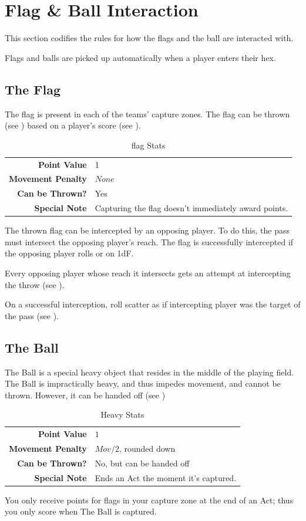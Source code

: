 \section{Flag \& Ball Interaction} \label{flag-interaction}
This section codifies the rules for how the flags and the ball are interacted with.

Flags and balls are picked up automatically when a player enters their hex.

\subsection{The Flag}
The flag is present in each of the teams' capture zones.
The flag can be thrown (see ) based on a player's \throw{} score (see ).

\begin{table}[!ht]
    \centering
\begin{tabular}{r|l}
    \textbf{Point Value} & 1 \\
    \textbf{Movement Penalty} & $None$ \\
    \textbf{Can be Thrown?} & Yes \\
    \textbf{Special Note} & Capturing the flag doesn't immediately award points. \\
\end{tabular} 
    \caption{flag Stats}
    \label{tab:flag}
\end{table}
The thrown flag can be intercepted by an opposing player.
To do this, the pass must intersect the opposing player's reach.
The flag is successfully intercepted if the opposing player rolls \blank{} or \plus{} on 1dF.

Every opposing player whose reach it intersects gets an attempt at intercepting the throw (see ).

On a successful interception, roll scatter as if intercepting player was the target of the pass (see ).

\subsection{The Ball}
The Ball is a special heavy object that resides in the middle of the playing field.
The Ball is impractically heavy, and thus impedes movement, and cannot be thrown.
However, it can be handed off (see )

\begin{table}[!ht]
    \centering
\begin{tabular}{r|l}
    \textbf{Point Value} & $1$ \\
    \textbf{Movement Penalty} & $Mov/2$, rounded down \\
    \textbf{Can be Thrown?} & No, but can be handed off \\
    \textbf{Special Note} & Ends an Act the moment it's captured.\\
\end{tabular}
    \caption{Heavy Stats}
    \label{tab:heavy}
\end{table}
You only receive points for flags in your capture zone at the end of an Act; thus you only score when The Ball is captured.

